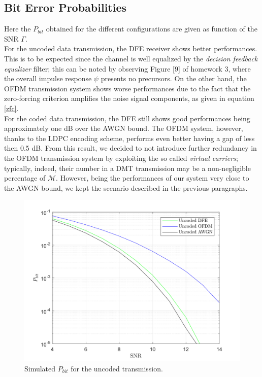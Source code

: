\documentclass[a4paper, 12pt]{report}
\begin{document}
\subsection*{Bit Error Probabilities}
Here the $P_{bit}$ obtained for the different configurations are given as function of the SNR $\Gamma$. \\
For the uncoded data transmission, the DFE receiver shows better performances. This is to be expected since the channel is well equalized by the \textit{decision feedback equalizer} filter; this can be noted by observing Figure [9] of homework 3, where the overall impulse response $\psi$ presents no precursors. On the other hand, the OFDM transmission system shows worse performances due to the fact that the zero-forcing criterion amplifies the noise signal components, as given in equation \eqref{zfc}. \\
For the coded data transmission, the DFE still shows good performances being approximately one dB over the AWGN bound. The OFDM system, however, thanks to the LDPC encoding scheme, performs even better having a gap of less then 0.5 dB. From this result, we decided to not introduce further redundancy in the OFDM transmission system by exploiting the so called \textit{virtual carriers}; typically, indeed, their number in a DMT transmission may be a non-negligible percentage of $\mathcal{M}$. However, being the performances of our system very close to the AWGN bound, we kept the scenario described in the previous paragraphs.

\begin{figure}[H]
	\centering
	\includegraphics[width=14cm]{uncoded}
	\caption{Simulated $P_{bit}$ for the uncoded transmission.}\label{uncoded}
\end{figure}
\end{document}

